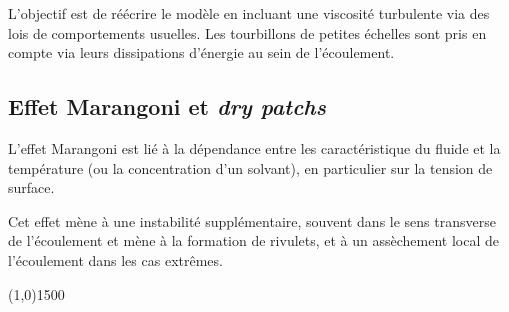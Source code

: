\documentclass[a0,portrait]{a0poster}
\begin{document}
\begin{multicols}{2}
\begin{multicols}{2}
        L'objectif est de réécrire le modèle en incluant une viscosité turbulente via des lois de comportements usuelles. Les tourbillons de petites échelles sont pris en compte via leurs dissipations d'énergie au sein de l'écoulement.

        \columnbreak

        \subsection*{Effet Marangoni et \emph{dry patchs}}
        L'effet Marangoni est lié à la dépendance entre les caractéristique du fluide et la température (ou la concentration d'un solvant), en particulier sur la tension de surface.

        Cet effet mène à une instabilité supplémentaire, souvent dans le sens transverse de l'écoulement et mène à la formation de rivulets, et à un assèchement local de l'écoulement dans les cas extrêmes.

    \end{multicols}

\end{multicols}

\begin{center}
    \line(1,0){1500}
\end{center}
\end{document}
